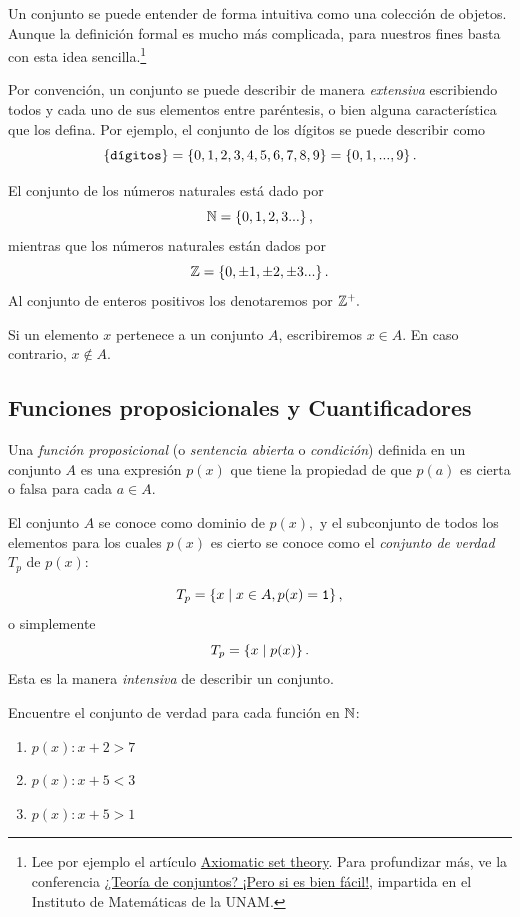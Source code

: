 Un conjunto se puede entender de forma intuitiva como una colección de objetos. Aunque la definición formal es mucho más complicada, para nuestros fines basta con esta idea sencilla.\footnote{Lee por ejemplo el artículo \href{https://www.britannica.com/science/set-theory/Axiomatic-set-theory}{Axiomatic set theory}. Para profundizar más, ve la conferencia \href{https://youtu.be/hLFit88zTYk}{¿Teoría de conjuntos? ¡Pero si es bien fácil!}, impartida en el Instituto de Matemáticas de la UNAM.}

Por convención, un conjunto se puede describir de manera \emph{extensiva} escribiendo todos y cada uno de sus elementos entre paréntesis, o bien alguna característica que los defina. Por ejemplo, el conjunto de los dígitos se puede describir como
\[
	\left\{ \texttt{dígitos} \right\}=\left\{ 0,1,2,3,4,5,6,7,8,9 \right\}=\left\{ 0,1,...,9 \right\}.
\]

	El conjunto de los números naturales está dado por
	\[ \mathbb{N} = \left\{ 0,1,2,3... \right\} ,\]	
	mientras que los números naturales están dados por 
	\[ \mathbb{Z} = \left\{ 0,\pm 1, \pm 2, \pm 3... \right\} .\]	
	Al conjunto de enteros positivos los denotaremos por $ \mathbb{Z}^{+}. $
	
		Si un elemento $ x $ pertenece a un conjunto $ A $, escribiremos $ x\in A $. En caso contrario, $ x\not \in A $.

\subsection{Funciones proposicionales y Cuantificadores}


 Una \emph{función proposicional} (o \emph{sentencia abierta} o \emph{condición}) definida en un conjunto $A$ es una expresión $p(x)$ que tiene la propiedad de que $p(a)$ es cierta o falsa para cada $a \in A.$



 El conjunto $A$ se conoce como dominio de $p(x),$ y el subconjunto de todos los elementos para los cuales $p(x)$ es cierto se conoce como el \emph{conjunto de verdad} $T_{p}$ de $p(x):$
 
 $$T_{p}=\left\{ x \mid x\in A, p(x)=\texttt{1} \right\},$$ 
 o simplemente 
 $$
 T_{p}=\left\{ x \mid p(x) \right\}.
 $$
Esta es la manera \emph{intensiva} de describir un conjunto.



 \begin{resuelto}
  \label{lip:exmp:4.7}
  Encuentre el conjunto de verdad para cada función en $\mathbb{N}$:
  \begin{enumerate}
   \item $p(x): x+2>7$ 
   \item $p(x): x+5<3$ 
   \item $p(x): x+5>1$ 
  \end{enumerate}

 \end{resuelto}



